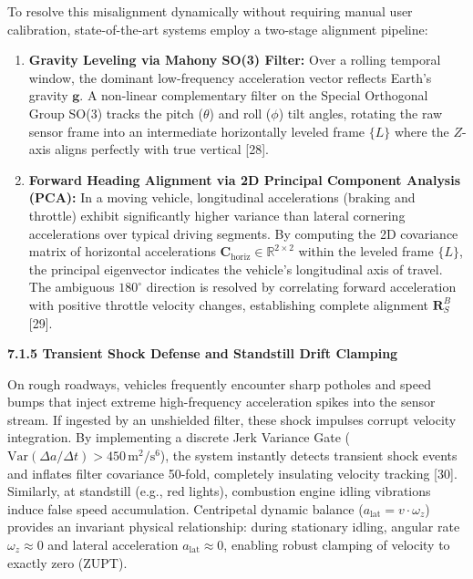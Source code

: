 \documentclass[11pt,a4paper]{article}
\begin{document}
To resolve this misalignment dynamically without requiring manual user calibration, state-of-the-art systems employ a two-stage alignment pipeline:
\begin{enumerate}[label=(\alph*),leftmargin=0.8cm,itemsep=2pt]
\item \textbf{Gravity Leveling via Mahony SO(3) Filter:} Over a rolling temporal window, the dominant low-frequency acceleration vector reflects Earth's gravity $\mathbf{g}$. A non-linear complementary filter on the Special Orthogonal Group SO(3) tracks the pitch ($\theta$) and roll ($\phi$) tilt angles, rotating the raw sensor frame into an intermediate horizontally leveled frame $\{L\}$ where the $Z$-axis aligns perfectly with true vertical [28].
\item \textbf{Forward Heading Alignment via 2D Principal Component Analysis (PCA):} In a moving vehicle, longitudinal accelerations (braking and throttle) exhibit significantly higher variance than lateral cornering accelerations over typical driving segments. By computing the 2D covariance matrix of horizontal accelerations $\mathbf{C}_{\text{horiz}} \in \mathbb{R}^{2 \times 2}$ within the leveled frame $\{L\}$, the principal eigenvector indicates the vehicle's longitudinal axis of travel. The ambiguous $180^\circ$ direction is resolved by correlating forward acceleration with positive throttle velocity changes, establishing complete alignment $\mathbf{R}_S^B$ [29].
\end{enumerate}

\textbf{7.1.5 Transient Shock Defense and Standstill Drift Clamping}

On rough roadways, vehicles frequently encounter sharp potholes and speed bumps that inject extreme high-frequency acceleration spikes into the sensor stream. If ingested by an unshielded filter, these shock impulses corrupt velocity integration. By implementing a discrete Jerk Variance Gate ($\text{Var}(\Delta a / \Delta t) > 450\,\text{m}^2/\text{s}^6$), the system instantly detects transient shock events and inflates filter covariance 50-fold, completely insulating velocity tracking [30]. Similarly, at standstill (e.g., red lights), combustion engine idling vibrations induce false speed accumulation. Centripetal dynamic balance ($a_{\text{lat}} = v \cdot \omega_z$) provides an invariant physical relationship: during stationary idling, angular rate $\omega_z \approx 0$ and lateral acceleration $a_{\text{lat}} \approx 0$, enabling robust clamping of velocity to exactly zero (ZUPT).
\newpage
\end{document}
